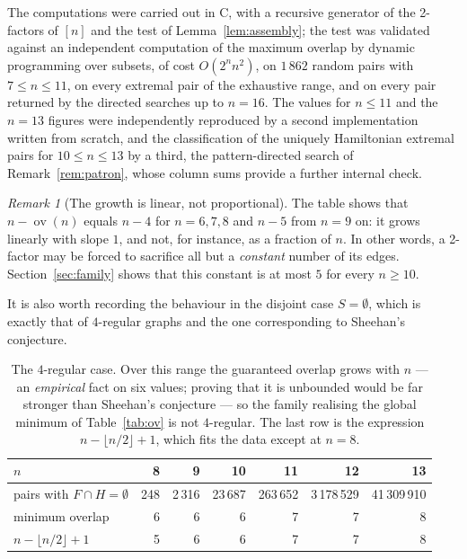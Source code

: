 \documentclass[11pt,a4paper]{article}
\theoremstyle{definition}
\theoremstyle{remark}
\newtheorem{remark}[theorem]{Remark}
\newcommand{\ov}{\operatorname{ov}}
\begin{document}
The computations were carried out in C, with a recursive generator of the 2-factors of $[n]$ and the test of Lemma~\ref{lem:assembly}; the test was validated against an independent computation of the maximum overlap by dynamic programming over subsets, of cost $O(2^n n^2)$, on $1\,862$ random pairs with $7\le n\le11$, on every extremal pair of the exhaustive range, and on every pair returned by the directed searches up to $n=16$. The values for $n\le11$ and the $n=13$ figures were independently reproduced by a second implementation written from scratch, and the classification of the uniquely Hamiltonian extremal pairs for $10\le n\le13$ by a third, the pattern-directed search of Remark~\ref{rem:patron}, whose column sums provide a further internal check.

\begin{remark}[The growth is linear, not proportional]\label{rem:growth}
The table shows that $n-\ov(n)$ equals $n-4$ for $n=6,7,8$ and $n-5$ from $n=9$ on: it grows linearly with slope $1$, and not, for instance, as a fraction of $n$. In other words, a 2-factor may be forced to sacrifice all but a \emph{constant} number of its edges. Section~\ref{sec:family} shows that this constant is at most $5$ for every $n\ge10$.
\end{remark}

It is also worth recording the behaviour in the disjoint case $S=\emptyset$, which is exactly that of $4$-regular graphs and the one corresponding to Sheehan's conjecture.

\begin{table}[h]
\centering
\begin{tabular}{lrrrrrr}
\toprule
$n$ & 8 & 9 & 10 & 11 & 12 & 13\\
\midrule
pairs with $F\cap H=\emptyset$ & 248 & 2\,316 & 23\,687 & 263\,652 & 3\,178\,529 & 41\,309\,910\\
minimum overlap & 6 & 6 & 6 & 7 & 7 & 8\\
$n-\lfloor n/2\rfloor+1$ & 5 & 6 & 6 & 7 & 7 & 8\\
\bottomrule
\end{tabular}
\caption{The $4$-regular case. Over this range the guaranteed overlap grows with $n$ --- an \emph{empirical} fact on six values; proving that it is unbounded would be far stronger than Sheehan's conjecture --- so the family realising the global minimum of Table~\ref{tab:ov} is not $4$-regular. The last row is the expression $n-\lfloor n/2\rfloor+1$, which fits the data except at $n=8$.}\label{tab:reg4}
\end{table}
\end{document}
